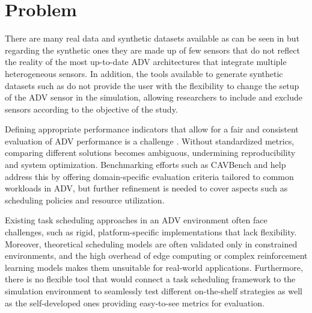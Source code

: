 
\section{Problem} \label{intro:problema}

There are many real data and synthetic datasets available as can be seen in \cite{liu2024} but regarding the synthetic ones they are made up of few sensors that do not reflect the reality of the most up-to-date ADV architectures that integrate multiple heterogeneous sensors. In addition, the tools available to generate synthetic datasets such as \cite{Nesti2024CARLA-GeAR:Models} do not provide the user with the flexibility to change the setup of the ADV sensor in the simulation, allowing researchers to include and exclude sensors according to the objective of the study.

Defining appropriate performance indicators that allow for a fair and consistent evaluation of ADV performance is a challenge \cite{Kowalczyk2022EfficientVerification}. Without standardized metrics, comparing different solutions becomes ambiguous, undermining reproducibility and system optimization. Benchmarking efforts such as CAVBench \cite{wang2018} and \cite{Jambotkar2021AdaptiveImprovement} help address this by offering domain-specific evaluation criteria tailored to common workloads in ADV, but further refinement is needed to cover aspects such as scheduling policies and resource utilization.

Existing task scheduling approaches in an ADV environment often face challenges, such as rigid, platform-specific implementations that lack flexibility. Moreover, theoretical scheduling models are often validated only in constrained environments, and the high overhead of edge computing or complex reinforcement learning models makes them unsuitable for real-world applications. Furthermore, there is no flexible tool that would connect a task scheduling framework to the simulation environment to seamlessly test different on-the-shelf strategies as well as the self-developed ones providing easy-to-see metrics for evaluation.

